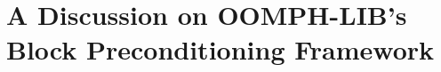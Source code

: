 \documentclass[12pt,a4paper]{report}
\begin{document}
%

\pagestyle{plain}
\setcounter{page}{1}


%

%

%

%

\chapter{A Discussion on OOMPH-LIB's Block Preconditioning Framework\label{chap:block_preconditioning_framework}}


%

%

\thispagestyle{empty}\newpage

\appendix
%
%

%
\end{document}
